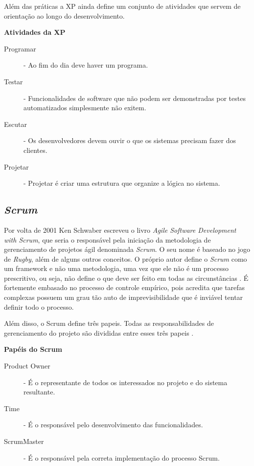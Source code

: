 \documentclass[
	article,			%
	11pt,				%
	oneside,			%
	a4paper,			%
	english,			%
	brazil,				%
	sumario=tradicional
	]{abntex2}
\begin{document}
Além das práticas a XP ainda define um conjunto de atividades que servem de
orientação ao longo do desenvolvimento.

\textbf{Atividades da XP}

\begin{description}
   \item[Programar] - Ao fim do dia deve haver um programa.
   \item[Testar] - Funcionalidades de software que não podem ser demonstradas
   por testes automatizados simplesmente não exitem.
   \item[Escutar] - Os desenvolvedores devem ouvir o que os sistemas precisam
   fazer dos clientes.
   \item[Projetar] - Projetar é criar uma estrutura que organize a lógica no
   sistema.
\end{description}

\subsection{\textit{Scrum}}

Por volta de 2001 Ken Schwaber escreveu o livro \textit{Agile Software
Development with Scrum}, que seria o responsável pela iniciação da metodologia
de gerenciamento de projetos ágil denominada \textit{Scrum}. O seu nome é
baseado no jogo de \textit{Rugby}, além de alguns outros conceitos. O próprio
autor define o \textit{Scrum} como um framework e não uma metodologia, uma vez
que ele não é um processo prescritivo, ou seja, não define o que deve ser feito
em todas as circunstâncias \cite{schwaber2002agile}. É fortemente embasado no
processo de controle empírico, pois acredita que tarefas complexas possuem um
grau tão auto de imprevisibilidade que é inviável tentar definir todo o
processo.

Além disso, o Scrum define três papeis. Todas as responsabilidades de
gerenciamento do projeto são divididas entre esses três papeis
\cite{schwaber2002agile}.

\textbf{Papéis do Scrum}

\begin{description}
   \item[Product Owner] - É o representante de todos os interessados no projeto
   e do sistema resultante.
   \item[Time] - É o responsável pelo desenvolvimento das funcionalidades.
   \item[ScrumMaster] - É o responsável pela correta implementação do processo
   Scrum.
\end{description}
\end{document}
